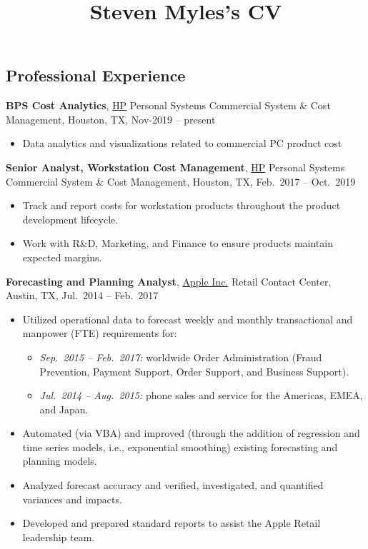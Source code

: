 \documentclass[
]{article}
\title{Steven Myles's CV}
\author{}
\date{\vspace{-2.5em}}
\providecommand{\tightlist}{%
  \setlength{\itemsep}{0pt}\setlength{\parskip}{0pt}}
\begin{document}
\maketitle

\hypertarget{professional-experience}{%
\subsection{Professional Experience}\label{professional-experience}}

\textbf{BPS Cost Analytics}, \href{https://www.hp.com/}{HP} Personal
Systems Commercial System \& Cost Management, Houston, TX, Nov-2019 --
present

\begin{itemize}
\tightlist
\item
  Data analytics and visualizations related to commercial PC product
  cost
\end{itemize}

\textbf{Senior Analyst, Workstation Cost Management},
\href{https://www.hp.com/}{HP} Personal Systems Commercial System \&
Cost Management, Houston, TX, Feb.~2017 -- Oct.~2019

\begin{itemize}
\tightlist
\item
  Track and report costs for workstation products throughout the product
  development lifecycle.
\item
  Work with R\&D, Marketing, and Finance to ensure products maintain
  expected margins.
\end{itemize}

\textbf{Forecasting and Planning Analyst},
\href{https://www.apple.com/}{Apple Inc.} Retail Contact Center, Austin,
TX, Jul.~2014 -- Feb.~2017

\begin{itemize}
\tightlist
\item
  Utilized operational data to forecast weekly and monthly transactional
  and manpower (FTE) requirements for:

  \begin{itemize}
  \tightlist
  \item
    \emph{Sep.~2015 -- Feb.~2017:} worldwide Order Administration (Fraud
    Prevention, Payment Support, Order Support, and Business Support).
  \item
    \emph{Jul.~2014 -- Aug.~2015:} phone sales and service for the
    Americas, EMEA, and Japan.
  \end{itemize}
\item
  Automated (via VBA) and improved (through the addition of regression
  and time series models, i.e., exponential smoothing) existing
  forecasting and planning models.
\item
  Analyzed forecast accuracy and verified, investigated, and quantified
  variances and impacts.
\item
  Developed and prepared standard reports to assist the Apple Retail
  leadership team.
\end{itemize}
\end{document}
